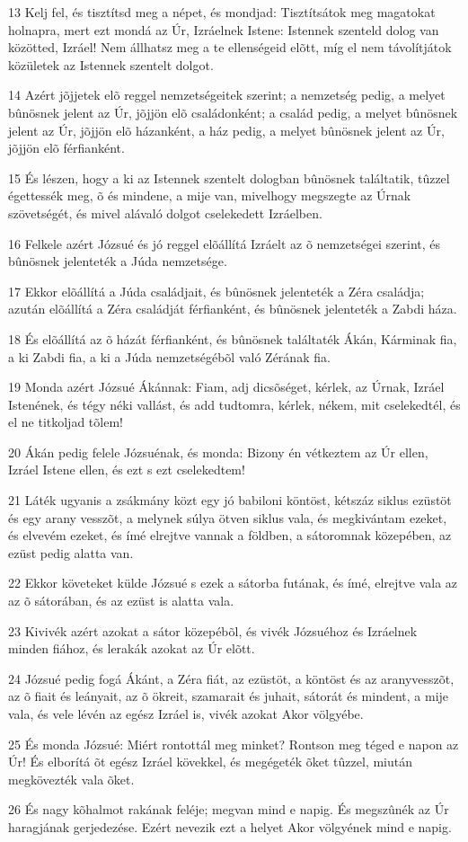 \par 13 Kelj fel, és tisztítsd meg a népet, és mondjad: Tisztítsátok meg magatokat holnapra, mert ezt mondá az Úr, Izráelnek Istene: Istennek szenteld dolog van közötted, Izráel! Nem állhatsz meg a te ellenségeid elõtt, míg el nem távolítjátok közületek az Istennek szentelt dolgot.
\par 14 Azért jõjjetek elõ reggel nemzetségeitek szerint; a nemzetség pedig, a melyet bûnösnek jelent az Úr, jõjjön elõ családonként; a család pedig, a melyet bûnösnek jelent az Úr, jõjjön elõ házanként, a ház pedig, a melyet bûnösnek jelent az Úr, jõjjön elõ férfianként.
\par 15 És lészen, hogy a ki az Istennek szentelt dologban bûnösnek találtatik, tûzzel égettessék meg, õ és mindene, a mije van, mivelhogy megszegte az Úrnak szövetségét, és mivel alávaló dolgot cselekedett Izráelben.
\par 16 Felkele azért Józsué és jó reggel elõállítá Izráelt az õ nemzetségei szerint, és bûnösnek jelenteték a Júda nemzetsége.
\par 17 Ekkor elõállítá a Júda családjait, és bûnösnek jelenteték a Zéra családja; azután elõállítá a Zéra családját férfianként, és bûnösnek jelenteték a Zabdi háza.
\par 18 És elõállítá az õ házát férfianként, és bûnösnek találtaték Ákán, Kárminak fia, a ki Zabdi fia, a ki a Júda nemzetségébõl való Zérának fia.
\par 19 Monda azért Józsué Ákánnak: Fiam, adj dicsõséget, kérlek, az Úrnak, Izráel Istenének, és tégy néki vallást, és add tudtomra, kérlek, nékem, mit cselekedtél,  és el ne titkoljad tõlem!
\par 20 Ákán pedig felele Józsuénak, és monda: Bizony én vétkeztem az Úr ellen, Izráel Istene ellen, és ezt s ezt cselekedtem!
\par 21 Láték ugyanis a zsákmány közt egy jó babiloni köntöst, kétszáz siklus ezüstöt és egy arany vesszõt, a melynek súlya ötven siklus vala, és megkivántam ezeket, és elvevém ezeket, és ímé elrejtve vannak a földben, a sátoromnak közepében, az ezüst pedig alatta van.
\par 22 Ekkor követeket külde Józsué s ezek a sátorba futának, és ímé, elrejtve vala az az õ sátorában, és az ezüst is alatta vala.
\par 23 Kivivék azért azokat a sátor közepébõl, és vivék Józsuéhoz és Izráelnek minden fiához, és lerakák azokat az Úr elõtt.
\par 24 Józsué pedig fogá Ákánt, a Zéra fiát, az ezüstöt, a köntöst és az aranyvesszõt, az õ fiait és leányait, az õ ökreit, szamarait és juhait, sátorát és mindent, a mije vala, és vele lévén az egész Izráel is, vivék azokat Akor völgyébe.
\par 25 És monda Józsué: Miért rontottál meg minket? Rontson meg téged e napon az Úr! És elborítá õt egész Izráel kövekkel, és megégeték õket tûzzel, miután megkövezték vala õket.
\par 26 És nagy kõhalmot rakának feléje; megvan mind e napig. És megszûnék az Úr haragjának gerjedezése. Ezért nevezik ezt a helyet Akor völgyének mind e napig.

